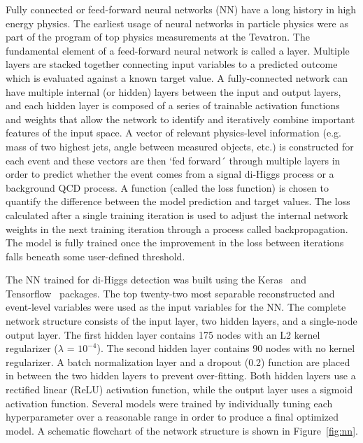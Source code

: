 \label{sec:NN}
Fully connected or feed-forward neural networks (NN) have a long history in high energy physics. The earliest usage of neural networks in particle physics were as part of the program of top physics measurements at the Tevatron\cite{Abazov:2006gd, Aaltonen:2008sy}. The fundamental element of a feed-forward neural network is called a layer. Multiple layers are stacked together connecting input variables to a predicted outcome which is evaluated against a known target value. A fully-connected network can have multiple internal (or hidden) layers between the input and output layers, and each hidden layer is composed of a series of trainable activation functions and weights that allow the network to identify and iteratively combine important features of the input space. A vector of relevant physics-level information (e.g. mass of two highest \pt jets, angle between measured objects, etc.) is constructed for each event and these vectors are then `fed forward´ through multiple layers in order to predict whether the event comes from a signal di-Higgs process or a background QCD process. A function (called the loss function) is chosen to quantify the difference between the model prediction and target values. The loss calculated after a single training iteration is used to adjust the internal network weights in the next training iteration through a process called backpropagation. The model is fully trained once the improvement in the loss between iterations falls beneath some user-defined threshold.

The NN trained for di-Higgs detection was built using the Keras~\cite{chollet2015keras} and Tensorflow~\cite{tensorflow} packages. The top twenty-two most separable reconstructed and event-level variables were used as the input variables for the NN. The complete network structure consists of the input layer, two hidden layers, and a single-node output layer. The first hidden layer contains 175 nodes with an L2 kernel regularizer ($\lambda$ = $10^{-4}$). The second hidden layer contains 90 nodes with no kernel regularizer. A batch normalization layer and a dropout (0.2) function are placed in between the two hidden layers to prevent over-fitting. Both hidden layers use a rectified linear (ReLU) activation function, while the output layer uses a sigmoid activation function. Several models were trained by individually tuning each hyperparameter over a reasonable range in order to produce a final optimized model. A schematic flowchart of the network structure is shown in Figure~\ref{fig:nn}.

